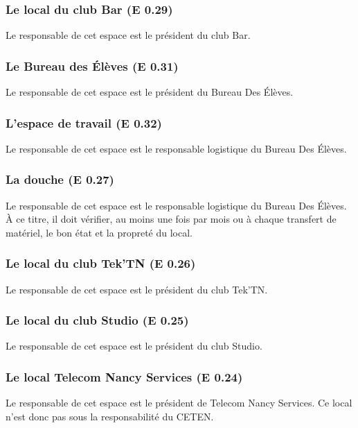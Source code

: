 \documentclass{article} %
\begin{document}
			\subsubsection{Le local du club Bar (E 0.29)}

				Le responsable de cet espace est le président du club Bar.

			\subsubsection{Le Bureau des Élèves (E 0.31)}

				Le responsable de cet espace est le président du Bureau Des
				Élèves.

			\subsubsection{L’espace de travail (E 0.32)}

			Le responsable de cet espace est le responsable logistique du
			Bureau Des Élèves.

			\subsubsection{La douche (E 0.27)}

				Le responsable de cet espace est le responsable logistique du
				Bureau Des Élèves. À ce titre, il doit vérifier, au moins une
				fois par mois ou à chaque transfert de matériel, le bon état et
				la propreté du local.

			\subsubsection{Le local du club Tek’TN (E 0.26)}

				Le responsable de cet espace est le président du club Tek’TN. 

			\subsubsection{Le local du club Studio (E 0.25)}

				Le responsable de cet espace est le président du club Studio. 

			\subsubsection{Le local Telecom Nancy Services (E 0.24)}

				Le responsable de cet espace est le président de Telecom Nancy
				Services. Ce local n’est donc pas sous la responsabilité du
				CETEN.
\end{document}

